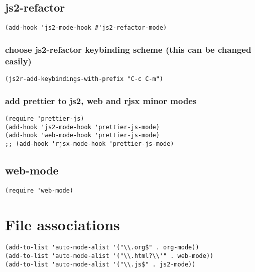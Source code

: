 \documentclass[11pt]{article}
\begin{document}
\subsection*{js2-refactor}
\label{sec:org3468425}

\begin{verbatim}
(add-hook 'js2-mode-hook #'js2-refactor-mode)
\end{verbatim}


\subsubsection*{choose js2-refactor keybinding scheme (this can be changed easily)}
\label{sec:org8321b3f}

\begin{verbatim}
(js2r-add-keybindings-with-prefix "C-c C-m")
\end{verbatim}


\subsubsection*{add prettier to js2, web and rjsx minor modes}
\label{sec:org912a2b1}
\begin{verbatim}
(require 'prettier-js)
(add-hook 'js2-mode-hook 'prettier-js-mode)
(add-hook 'web-mode-hook 'prettier-js-mode)
;; (add-hook 'rjsx-mode-hook 'prettier-js-mode)
\end{verbatim}




\subsection*{web-mode}
\label{sec:orgb04a6ab}

\begin{verbatim}
(require 'web-mode)
\end{verbatim}


\section*{File associations}
\label{sec:orgb0a5684}

\begin{verbatim}
(add-to-list 'auto-mode-alist '("\\.org$" . org-mode))
(add-to-list 'auto-mode-alist '("\\.html?\\'" . web-mode))
(add-to-list 'auto-mode-alist '("\\.js$" . js2-mode))
\end{verbatim}
\end{document}
